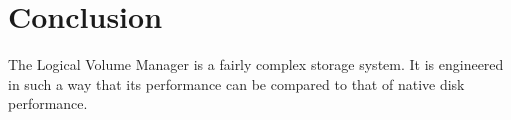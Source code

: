 \chapter{Conclusion}
The Logical Volume Manager is a fairly complex storage system. It is engineered
in such a way that its performance can be compared to that of native disk
performance.
